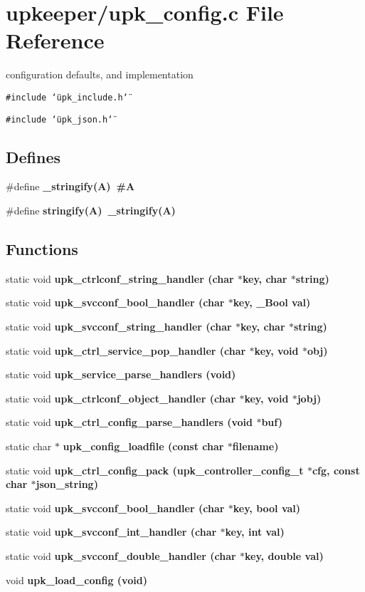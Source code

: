 \section{upkeeper/upk\_\-config.c File Reference}
\label{upk__config_8c}
configuration defaults, and implementation 

{\tt \#include \char`\"{}upk\_\-include.h\char`\"{}}\par
{\tt \#include \char`\"{}upk\_\-json.h\char`\"{}}\par
\subsection*{Defines}
\begin{CompactItemize}
\item 
\#define \bf{\_\-stringify}(A)~\#A
\item 
\#define \bf{stringify}(A)~\_\-stringify(A)
\end{CompactItemize}
\subsection*{Functions}
\begin{CompactItemize}
\item 
static void \bf{upk\_\-ctrlconf\_\-string\_\-handler} (char $\ast$key, char $\ast$string)
\item 
static void \bf{upk\_\-svcconf\_\-bool\_\-handler} (char $\ast$key, \_\-Bool val)
\item 
static void \bf{upk\_\-svcconf\_\-string\_\-handler} (char $\ast$key, char $\ast$string)
\item 
static void \bf{upk\_\-ctrl\_\-service\_\-pop\_\-handler} (char $\ast$key, void $\ast$obj)
\item 
static void \bf{upk\_\-service\_\-parse\_\-handlers} (void)
\item 
static void \bf{upk\_\-ctrlconf\_\-object\_\-handler} (char $\ast$key, void $\ast$jobj)
\item 
static void \bf{upk\_\-ctrl\_\-config\_\-parse\_\-handlers} (void $\ast$buf)
\item 
static char $\ast$ \bf{upk\_\-config\_\-loadfile} (const char $\ast$filename)
\item 
static void \bf{upk\_\-ctrl\_\-config\_\-pack} (\bf{upk\_\-controller\_\-config\_\-t} $\ast$cfg, const char $\ast$json\_\-string)
\item 
static void \bf{upk\_\-svcconf\_\-bool\_\-handler} (char $\ast$key, bool val)
\item 
static void \bf{upk\_\-svcconf\_\-int\_\-handler} (char $\ast$key, int val)
\item 
static void \bf{upk\_\-svcconf\_\-double\_\-handler} (char $\ast$key, double val)
\item 
void \bf{upk\_\-load\_\-config} (void)
\end{CompactItemize}

